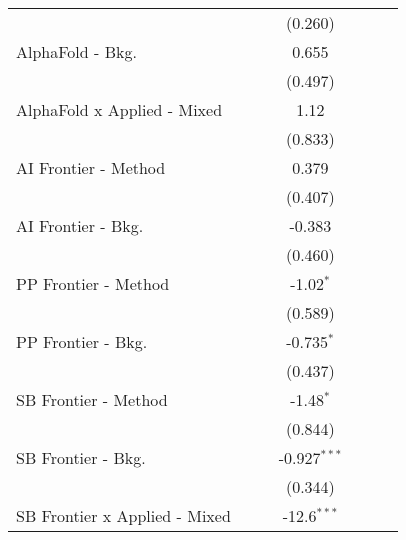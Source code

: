 \begin{tabular}{lcccccc}
                                  &               &         & (0.260)        &               &        &   \\   
   AlphaFold - Bkg.               &               &         & 0.655          &               &        &   \\   
                                  &               &         & (0.497)        &               &        &   \\   
   AlphaFold x Applied - Mixed    &               &         & 1.12           &               &        &   \\   
                                  &               &         & (0.833)        &               &        &   \\   
   AI Frontier - Method           &               &         & 0.379          &               &        &   \\   
                                  &               &         & (0.407)        &               &        &   \\   
   AI Frontier - Bkg.             &               &         & -0.383         &               &        &   \\   
                                  &               &         & (0.460)        &               &        &   \\   
   PP Frontier - Method           &               &         & -1.02$^{*}$    &               &        &   \\   
                                  &               &         & (0.589)        &               &        &   \\   
   PP Frontier - Bkg.             &               &         & -0.735$^{*}$   &               &        &   \\   
                                  &               &         & (0.437)        &               &        &   \\   
   SB Frontier - Method           &               &         & -1.48$^{*}$    &               &        &   \\   
                                  &               &         & (0.844)        &               &        &   \\   
   SB Frontier - Bkg.             &               &         & -0.927$^{***}$ &               &        &   \\   
                                  &               &         & (0.344)        &               &        &   \\   
   SB Frontier x Applied - Mixed  &               &         & -12.6$^{***}$  &               &        &   \\   

\end{tabular}

